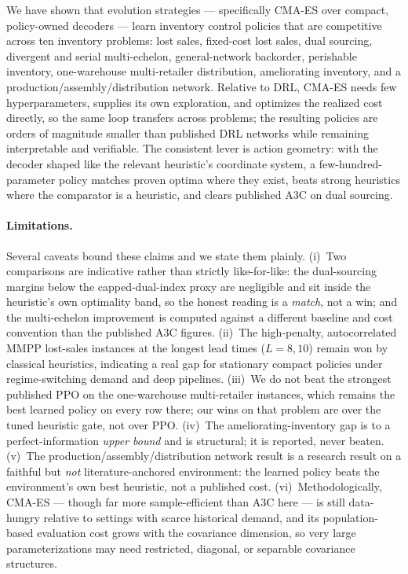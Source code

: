 We have shown that evolution strategies --- specifically CMA-ES over compact, policy-owned decoders ---
learn inventory control policies that are competitive across ten inventory problems: lost sales,
fixed-cost lost sales, dual sourcing, divergent and serial multi-echelon, general-network backorder,
perishable inventory, one-warehouse multi-retailer distribution, ameliorating inventory, and a
production/assembly/distribution network. Relative to DRL, CMA-ES needs few hyperparameters, supplies
its own exploration, and optimizes the realized cost directly, so the same loop transfers across
problems; the resulting policies are orders of magnitude smaller than published DRL networks while
remaining interpretable and verifiable. The consistent lever is action geometry: with the decoder
shaped like the relevant heuristic's coordinate system, a few-hundred-parameter policy matches proven
optima where they exist, beats strong heuristics where the comparator is a heuristic, and clears
published A3C on dual sourcing.

\paragraph{Limitations.}
Several caveats bound these claims and we state them plainly. (i)~Two comparisons are indicative rather
than strictly like-for-like: the dual-sourcing margins below the capped-dual-index proxy are negligible
and sit inside the heuristic's own optimality band, so the honest reading is a \emph{match}, not a win;
and the multi-echelon improvement is computed against a different baseline and cost convention than the
published A3C figures. (ii)~The high-penalty, autocorrelated MMPP lost-sales instances at the longest
lead times ($L=8,10$) remain won by classical heuristics, indicating a real gap for stationary compact
policies under regime-switching demand and deep pipelines. (iii)~We do not beat the strongest published
PPO on the one-warehouse multi-retailer instances, which remains the best learned policy on every row
there; our wins on that problem are over the tuned heuristic gate, not over PPO. (iv)~The
ameliorating-inventory gap is to a perfect-information \emph{upper bound} and is structural; it is
reported, never beaten. (v)~The production/assembly/distribution network result is a research result on
a faithful but \emph{not} literature-anchored environment: the learned policy beats the environment's
own best heuristic, not a published cost. (vi)~Methodologically, CMA-ES --- though far more
sample-efficient than A3C here --- is still data-hungry relative to settings with scarce historical
demand, and its population-based evaluation cost grows with the covariance dimension, so very large
parameterizations may need restricted, diagonal, or separable covariance structures.

